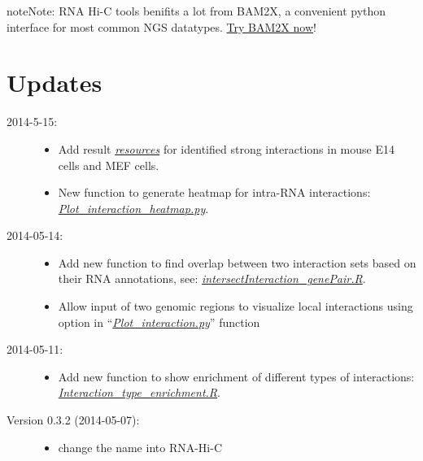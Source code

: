 \documentclass[letterpaper,10pt,english]{sphinxmanual}
\begin{document}
\begin{notice}{note}{Note:}
RNA Hi-C tools benifits a lot from BAM2X, a convenient python interface for most common NGS datatypes. \href{http://bam2xwiki.appspot.com/}{Try BAM2X now}!
\end{notice}


\chapter{Updates}
\label{index:updates}\begin{description}
\item[{2014-5-15:}] \leavevmode\begin{itemize}
\item {} 
Add result {\hyperref[Data_Resources:resource]{\emph{resources}}} for identified strong interactions in mouse E14 cells and MEF cells.

\item {} 
New function to generate heatmap for intra-RNA interactions: {\hyperref[Visualization:visualizationheatmap]{\emph{Plot\_interaction\_heatmap.py}}}.

\end{itemize}

\item[{2014-05-14:}] \leavevmode\begin{itemize}
\item {} 
Add new function to find overlap between two interaction sets based on their RNA annotations, see: {\hyperref[Analysis_pipeline:intersectiongene]{\emph{intersectInteraction\_genePair.R}}}.

\item {} 
Allow input of two genomic regions to visualize local interactions using  option in ``{\hyperref[Visualization:plotinteraction]{\emph{Plot\_interaction.py}}}'' function

\end{itemize}

\item[{2014-05-11:}] \leavevmode\begin{itemize}
\item {} 
Add new function to show enrichment of different types of interactions: {\hyperref[Visualization:visualizationenrich]{\emph{Interaction\_type\_enrichment.R}}}.

\end{itemize}

\item[{Version 0.3.2 (2014-05-07):}] \leavevmode\begin{itemize}
\item {} 
change the name into RNA-Hi-C


\end{itemize}
\end{description}
\end{document}
